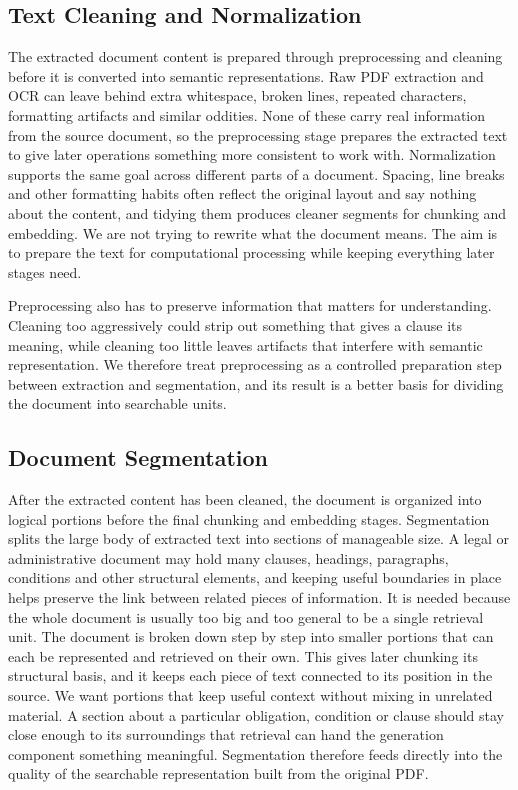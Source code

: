 \documentclass[12pt,a4paper,oneside]{report}
\begin{document}
\subsection{Text Cleaning and Normalization}

The extracted document content is prepared through preprocessing and
cleaning before it is converted into semantic representations. Raw PDF extraction and OCR can leave behind extra whitespace, broken lines, repeated characters, formatting artifacts and similar oddities. None of these carry real information from the source document, so the preprocessing stage prepares the extracted text to give later operations something more consistent to work with. Normalization supports the same goal across different parts of a document. Spacing, line breaks and other formatting habits often reflect the original layout and say nothing about the content, and tidying them produces cleaner segments for chunking and embedding. We are not trying to rewrite what the document means. The aim is to prepare the text for computational processing while keeping everything later stages need.

Preprocessing also has to preserve information that matters for understanding. Cleaning too aggressively could strip out something that gives a clause its meaning, while cleaning too little leaves artifacts that interfere with semantic representation. We therefore treat preprocessing as a controlled preparation step between extraction and segmentation, and its result is a better basis for dividing the document into searchable units.

\subsection{Document Segmentation}

After the extracted content has been cleaned, the document is organized into
logical portions before the final chunking and embedding stages. Segmentation splits the large body of extracted text into sections of manageable size. A legal or administrative document may hold many clauses, headings, paragraphs, conditions and other structural elements, and keeping useful boundaries in place helps preserve the link between related pieces of information. It is needed because the whole document is usually too big and too general to be a single retrieval unit. The document is broken down step by step into smaller portions that can each be represented and retrieved on their own. This gives later chunking its structural basis, and it keeps each piece of text connected to its position in the source. We want portions that keep useful context without mixing in unrelated material. A section about a particular obligation, condition or clause should stay close enough to its surroundings that retrieval can hand the generation component something meaningful. Segmentation therefore feeds directly into the quality of the searchable representation built from the original PDF.
\end{document}
